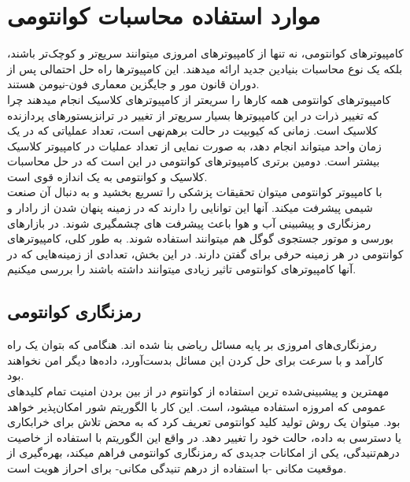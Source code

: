 \chapter{موارد استفاده محاسبات کوانتومی}
کامپیوترهای کوانتومی، نه تنها از کامپیوترهای امروزی میتوانند سریع‌تر و کوچک‌تر باشند، بلکه یک نوع محاسبات بنیادین جدید ارائه میدهند. این کامپیوترها راه حل احتمالی پس از دوران قانون مور و جایگزین معماری فون-نیومن
 هستند. 
\cite{fundamentalsandapplications}
\\
کامپیوترهای کوانتومی همه کارها را سریعتر از کامپیوترهای کلاسیک انجام میدهند چرا که تغییر ذرات در این کامپیوترها بسیار سریع‌تر از تغییر در ترانزیستورهای پردازنده کلاسیک است. زمانی که کیوبیت در حالت برهم‌نهی است، تعداد عملیاتی که در یک زمان واحد میتواند انجام دهد، به صورت نمایی از تعداد عملیات در کامپیوتر کلاسیک بیشتر است. دومین برتری کامپیوترهای کوانتومی در این است که در حل محاسبات کلاسیک و کوانتومی به یک اندازه قوی است. 
\\
با کامپیوتر کوانتومی میتوان تحقیقات پزشکی را تسریع بخشید و به دنبال آن صنعت شیمی پیشرفت میکند. آنها این توانایی را دارند که در زمینه پنهان شدن از رادار و رمزنگاری و پیشبینی آب و هوا باعث پیشرفت های چشمگیری شوند. در بازارهای بورسی و موتور جستجوی گوگل هم میتوانند استفاده شوند. به طور کلی، کامپیوترهای کوانتومی در هر زمینه حرفی برای گفتن دارند.
\cite{singhbook}
در این بخش، تعدادی از زمینه‌هایی که در آنها کامپیوترهای کوانتومی تاثیر زیادی میتوانند داشته باشند را بررسی میکنیم.
\section{رمزنگاری کوانتومی}
رمزنگاری‌های امروزی بر پایه مسائل ریاضی بنا شده اند. هنگامی که بتوان یک راه کارآمد و با سرعت برای حل کردن این مسائل بدست‌آورد، داده‌ها دیگر امن نخواهند بود.
\\
مهمترین و پیشبینی‌شده ترین استفاده از کوانتوم در از بین بردن امنیت تمام کلیدهای عمومی
که امروزه استفاده میشود، است. این کار با الگوریتم شور امکان‌پذیر خواهد بود. میتوان یک روش تولید کلید کوانتومی تعریف کرد که به محض تلاش برای خرابکاری یا دسترسی به داده، حالت خود را تغییر دهد. در واقع این الگوریتم با استفاده از خاصیت درهم‌تنیدگی، یکی از امکانات جدیدی که رمزنگاری کوانتومی فراهم میکند، بهره‌گیری از موقعیت مکانی -با استفاده از درهم تنیدگی مکانی‌- برای احراز هویت است.
\cite{quantuminfo}
\cite{fundamentalsandapplications}
